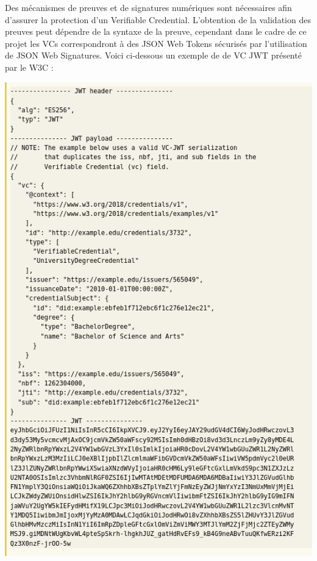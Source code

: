 \documentclass[12pt, openany]{report}
\begin{document}
\begin{flushleft}
Des mécanismes de preuves et de signatures numériques sont nécessaires afin d'assurer la protection d'un Verifiable Credential. L'obtention de la validation des preuves peut dépendre de la syntaxe de la preuve, cependant dans le cadre de ce projet les VCs correspondront à des JSON Web Tokens sécurisés par l'utilisation de JSON Web Signatures. Voici ci-dessous un exemple de de VC JWT présenté par le W3C :\\
\begin{center}
\includegraphics[scale=0.4]{vc2.png}
\end{center}
\end{flushleft}

\newpage
\end{document}
